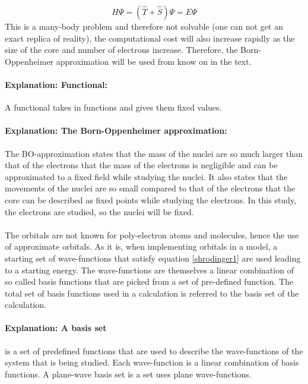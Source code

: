 \documentclass[12pt,a4paper]{article}
\begin{document}
\begin{equation} \label{shrodinger1}
H \Psi = ( \hat{T} + \hat{S}) \Psi = E \Psi
\end{equation}
This is a many-body problem and therefore not solvable (one can not get an exact replica of reality), the computational cost will also increase rapidly as the size of the core and number of electrons increase. Therefore, the Born-Oppenheimer approximation will be used from know on in the text.

\paragraph{Explanation: Functional:} \label{functional} A functional takes in functions and gives them fixed values. 

\paragraph{Explanation: The Born-Oppenheimer approximation:}
The BO-approximation states that the mass of the nuclei are so much larger than that of the electrons that the mass of the electrons is negligible and can be approximated to a fixed field while studying the nuclei. It also states that the movements of the nuclei are so small compared to that of the electrons that the core can be described as fixed points while studying the electrons. In this study, the electrons are studied, so the nuclei will be fixed. 

\paragraph*{}
 The orbitals are not known for poly-electron atoms and molecules, hence the use of approximate orbitals. As it is, when implementing orbitals in a model,  a starting set of wave-functions that satisfy equation \ref{shrodinger1} are used leading to a starting energy. The wave-functions are themselves a linear combination of so called basis functions that are picked from a set of pre-defined function. The total set of basis functions used in a calculation is referred to the basis set of the calculation. 

\paragraph{Explanation: A basis set} is a set of predefined functions that are used to describe the wave-functions of the system that is being studied. Each wave-function is a linear combination of basis functions. \cite{burke} A plane-wave basis set is a set uses plane wave-functions.
\end{document}

